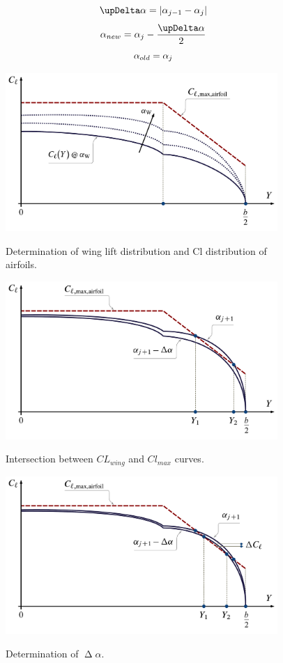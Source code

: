 \begin{equation}\notag
\upDelta \alpha =  |\alpha_{j-1} -\alpha_{j}|
\end{equation}
\begin{equation}\notag
\alpha_{new} = \alpha_{j} - \frac {\upDelta \alpha }{2}
\end{equation}
\begin{equation}\notag
\alpha_{old} = \alpha_j
\end{equation}



\begin{figure}[H]
\centering
{\includegraphics[height=6cm]{Immagini/Loading_Stall_Path_B}} 
\caption{Determination of wing lift distribution and Cl distribution of airfoils.}
\label{fig:stall1}
\end{figure}


\begin{figure}[H]
\centering
{\includegraphics[height=6cm]{Immagini/Loading_Stall_Path_D}} 
\caption{Intersection  between $CL_{wing}$ and $Cl_{max}$ curves.}
\label{fig:stall2}
\end{figure}

\begin{figure}[H]
\centering
{\includegraphics[height=6cm]{Immagini/Loading_Stall_Path_E}} 
\caption{Determination of $\upDelta \alpha$.}
\label{fig:stall5}
\end{figure}


